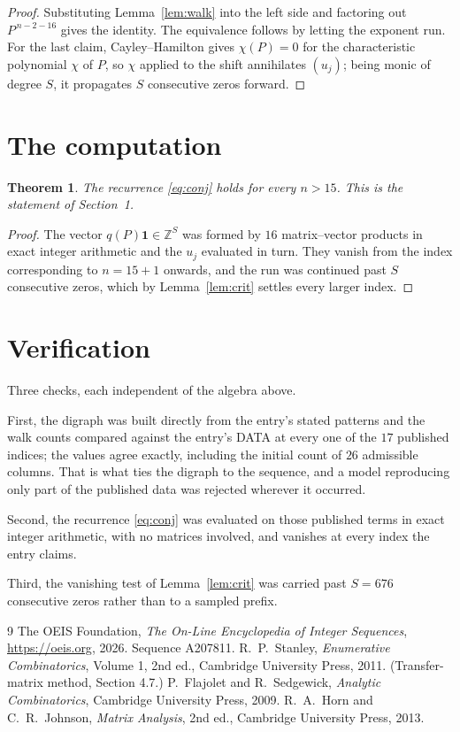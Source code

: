 \documentclass[11pt,a4paper]{article}
\theoremstyle{plain}
\newtheorem{theorem}{Theorem}
\theoremstyle{definition}
\begin{document}
\begin{proof}
Substituting Lemma~\ref{lem:walk} into the left side and factoring out
$P^{\,n-2-16}$ gives the identity. The equivalence follows by letting the exponent
run. For the last claim, Cayley--Hamilton gives $\chi(P)=0$ for the characteristic
polynomial $\chi$ of $P$, so $\chi$ applied to the shift annihilates $(u_j)$; being monic of
degree $S$, it propagates $S$ consecutive zeros forward.
\end{proof}

\section{The computation}

\begin{theorem}
The recurrence \eqref{eq:conj} holds for every $n>15$. This is the statement of
Section~1.
\end{theorem}

\begin{proof}
The vector $q(P)\mathbf{1}\in\mathbb{Z}^{S}$ was formed by $16$ matrix--vector
products in exact integer arithmetic and the $u_j$ evaluated in turn. They vanish from the
index corresponding to $n=15+1$ onwards, and the run was continued past $S$ consecutive
zeros, which by Lemma~\ref{lem:crit} settles every larger index.
\end{proof}

\section{Verification}

Three checks, each independent of the algebra above.

First, the digraph was built directly from the entry's stated patterns and the walk counts
compared against the entry's DATA at every one of the $17$ published indices; the
values agree exactly, including the initial count of $26$ admissible columns. That is
what ties the digraph to the sequence, and a model reproducing only part of the published
data was rejected wherever it occurred.

Second, the recurrence \eqref{eq:conj} was evaluated on those published terms in exact
integer arithmetic, with no matrices involved, and vanishes at every index the entry claims.

Third, the vanishing test of Lemma~\ref{lem:crit} was carried past $S=676$ consecutive
zeros rather than to a sampled prefix.

\begin{thebibliography}{9}
 The OEIS Foundation, \emph{The On-Line Encyclopedia of Integer
Sequences}, \url{https://oeis.org}, 2026. Sequence A207811.
 R.~P.~Stanley, \emph{Enumerative Combinatorics}, Volume 1, 2nd ed.,
Cambridge University Press, 2011. (Transfer-matrix method, Section 4.7.)
 P.~Flajolet and R.~Sedgewick, \emph{Analytic Combinatorics}, Cambridge
University Press, 2009.
 R.~A.~Horn and C.~R.~Johnson, \emph{Matrix Analysis}, 2nd ed., Cambridge
University Press, 2013.
\end{thebibliography}
\end{document}
